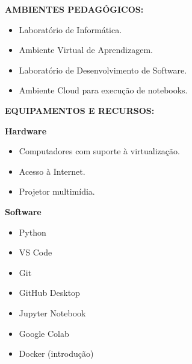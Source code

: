 \textbf{AMBIENTES PEDAGÓGICOS:}
\begin{itemize}
    \item Laboratório de Informática.
    \item Ambiente Virtual de Aprendizagem.
    \item Laboratório de Desenvolvimento de Software.
    \item Ambiente Cloud para execução de notebooks.
\end{itemize}

\textbf{EQUIPAMENTOS E RECURSOS:}

\textbf{Hardware}
\begin{itemize}
    \item Computadores com suporte à virtualização.
    \item Acesso à Internet.
    \item Projetor multimídia.
\end{itemize}

\textbf{Software}
\begin{itemize}
    \item Python
    \item VS Code
    \item Git
    \item GitHub Desktop
    \item Jupyter Notebook
    \item Google Colab
    \item Docker (introdução)
\end{itemize}
